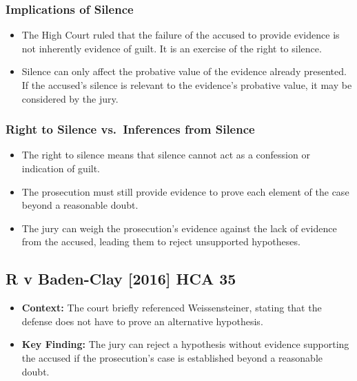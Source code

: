 \subsubsection{Implications of Silence}\label{implications-of-silence}

\begin{itemize}
\tightlist
\item
  The High Court ruled that the failure of the accused to provide
  evidence is not inherently evidence of guilt. It is an exercise of the
  right to silence.
\item
  Silence can only affect the probative value of the evidence already
  presented. If the accused's silence is relevant to the evidence's
  probative value, it may be considered by the jury.
\end{itemize}

\subsubsection{Right to Silence vs.~Inferences from
Silence}\label{right-to-silence-vs.-inferences-from-silence}

\begin{itemize}
\tightlist
\item
  The right to silence means that silence cannot act as a confession or
  indication of guilt.
\item
  The prosecution must still provide evidence to prove each element of
  the case beyond a reasonable doubt.
\item
  The jury can weigh the prosecution's evidence against the lack of
  evidence from the accused, leading them to reject unsupported
  hypotheses.
\end{itemize}

\subsection{  R v Baden-Clay {[}2016{]} HCA
35}\label{r-v-baden-clay-2016-hca-35}

\begin{itemize}
\tightlist
\item
  \textbf{Context:} The court briefly referenced Weissensteiner, stating
  that the defense does not have to prove an alternative hypothesis.
\item
  \textbf{Key Finding:} The jury can reject a hypothesis without
  evidence supporting the accused if the prosecution's case is
  established beyond a reasonable doubt.
\end{itemize}

